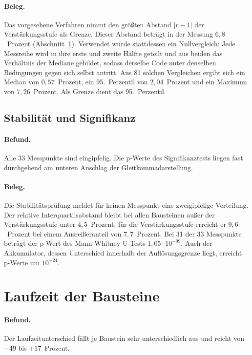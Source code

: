 \paragraph{Beleg.}
Das vorgesehene Verfahren nimmt den größten Abstand $|r-1|$ der Verstärkungsstufe als Grenze. Dieser Abstand beträgt in der Messung $6{,}8$~Prozent (Abschnitt~\ref{sec:eval-laufzeit}). Verwendet wurde stattdessen ein Nullvergleich: Jede Messreihe wird in ihre erste und zweite Hälfte geteilt und aus beiden das Verhältnis der Mediane gebildet, sodass derselbe Code unter denselben Bedingungen gegen sich selbst antritt. Aus 81 solchen Vergleichen ergibt sich ein Median von $0{,}57$~Prozent, ein 95.~Perzentil von $2{,}04$~Prozent und ein Maximum von $7{,}26$~Prozent. Als Grenze dient das 95.~Perzentil.

\subsection{Stabilität und Signifikanz}

\paragraph{Befund.}
Alle 33 Messpunkte sind eingipfelig. Die p-Werte des Signifikanztests liegen fast durchgehend am unteren Anschlag der Gleitkommadarstellung.

\paragraph{Beleg.}
Die Stabilitätsprüfung meldet für keinen Messpunkt eine zweigipfelige Verteilung. Der relative Interquartilsabstand bleibt bei allen Bausteinen außer der Verstärkungsstufe unter $4{,}5$~Prozent; für die Verstärkungsstufe erreicht er $9{,}6$~Prozent bei einem Ausreißeranteil von $7{,}7$~Prozent. Bei 31 der 33 Messpunkte beträgt der p-Wert des Mann-Whitney-U-Tests $1{,}05\cdot10^{-99}$. Auch der Akkumulator, dessen Unterschied innerhalb der Auflösungsgrenze liegt, erreicht p-Werte um $10^{-24}$.

\section{Laufzeit der Bausteine}
\label{sec:eval-laufzeit}

\paragraph{Befund.}
Der Laufzeitunterschied fällt je Baustein sehr unterschiedlich aus und reicht von $-49$ bis $+17$~Prozent.

